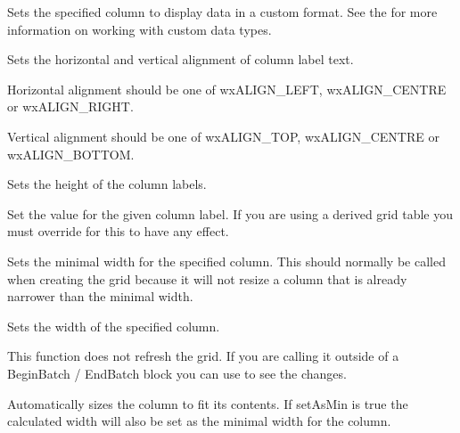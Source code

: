 Sets the specified column to display data in a custom format.
See the  for more information on working
with custom data types.

\label{wxgridsetcollabelalignment}


Sets the horizontal and vertical alignment of column label text.

Horizontal alignment should be one of wxALIGN\_LEFT, wxALIGN\_CENTRE or wxALIGN\_RIGHT.

Vertical alignment should be one of wxALIGN\_TOP, wxALIGN\_CENTRE or wxALIGN\_BOTTOM.

\label{wxgridsetcollabelsize}


Sets the height of the column labels.

\label{wxgridsetcollabelvalue}


Set the value for the given column label. If you are using a derived grid table you must 
override 
for this to have any effect.

\label{wxgridsetcolminimalwidth}


Sets the minimal width for the specified column. This should normally be called when creating the grid
because it will not resize a column that is already narrower than the minimal width.

\label{wxgridsetcolsize}


Sets the width of the specified column. 

This function does not refresh the grid. If you are calling it outside of a BeginBatch / EndBatch
block you can use  to see the changes. 

Automatically sizes the column to fit its contents. If setAsMin is true the calculated width will
also be set as the minimal width for the column.


